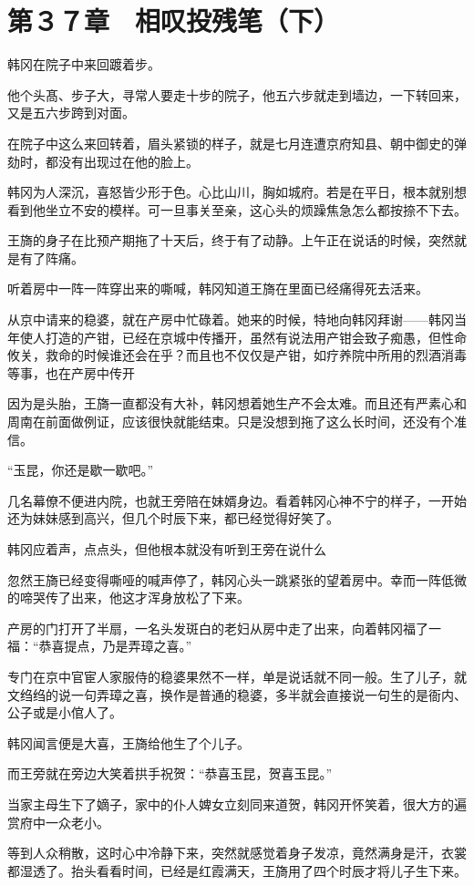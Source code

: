 \section{第３７章　相叹投残笔（下）}

韩冈在院子中来回踱着步。

他个头髙、步子大，寻常人要走十步的院子，他五六步就走到墙边，一下转回来，又是五六步跨到对面。

在院子中这么来回转着，眉头紧锁的样子，就是七月连遭京府知县、朝中御史的弹劾时，都没有出现过在他的脸上。

韩冈为人深沉，喜怒皆少形于色。心比山川，胸如城府。若是在平日，根本就别想看到他坐立不安的模样。可一旦事关至亲，这心头的烦躁焦急怎么都按捺不下去。

王旖的身子在比预产期拖了十天后，终于有了动静。上午正在说话的时候，突然就是有了阵痛。

听着房中一阵一阵穿出来的嘶喊，韩冈知道王旖在里面已经痛得死去活来。

从京中请来的稳婆，就在产房中忙碌着。她来的时候，特地向韩冈拜谢——韩冈当年使人打造的产钳，已经在京城中传播开，虽然有说法用产钳会致子痴愚，但性命攸关，救命的时候谁还会在乎？而且也不仅仅是产钳，如疗养院中所用的烈酒消毒等事，也在产房中传开

因为是头胎，王旖一直都没有大补，韩冈想着她生产不会太难。而且还有严素心和周南在前面做例证，应该很快就能结束。只是没想到拖了这么长时间，还没有个准信。

“玉昆，你还是歇一歇吧。”

几名幕僚不便进内院，也就王旁陪在妹婿身边。看着韩冈心神不宁的样子，一开始还为妹妹感到高兴，但几个时辰下来，都已经觉得好笑了。

韩冈应着声，点点头，但他根本就没有听到王旁在说什么

忽然王旖已经变得嘶哑的喊声停了，韩冈心头一跳紧张的望着房中。幸而一阵低微的啼哭传了出来，他这才浑身放松了下来。

产房的门打开了半扇，一名头发斑白的老妇从房中走了出来，向着韩冈福了一福：“恭喜提点，乃是弄璋之喜。”

专门在京中官宦人家服侍的稳婆果然不一样，单是说话就不同一般。生了儿子，就文绉绉的说一句弄璋之喜，换作是普通的稳婆，多半就会直接说一句生的是衙内、公子或是小倌人了。

韩冈闻言便是大喜，王旖给他生了个儿子。

而王旁就在旁边大笑着拱手祝贺：“恭喜玉昆，贺喜玉昆。”

当家主母生下了嫡子，家中的仆人婢女立刻同来道贺，韩冈开怀笑着，很大方的遍赏府中一众老小。

等到人众稍散，这时心中冷静下来，突然就感觉着身子发凉，竟然满身是汗，衣裳都湿透了。抬头看看时间，已经是红霞满天，王旖用了四个时辰才将儿子生下来。

